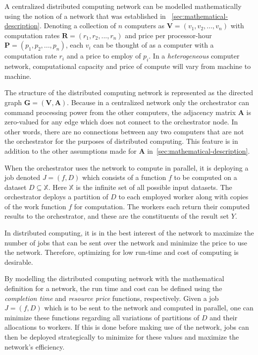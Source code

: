 \documentclass[../mthe-493-project-proposal.tex]{subfiles}
\begin{document}
    A centralized distributed computing network can be modelled mathematically using the notion of a network that was established in ~\autoref{sec:mathematical-description}. Denoting a collection of $n$ computers as $\mathbf{V} = (v_1, v_2, ..., v_n)$ with computation rates $\mathbf{R} = (r_1, r_2, ..., r_n)$ and price per processor-hour $\mathbf{P} = (p_1, p_2, ..., p_n)$, each $v_i$ can be thought of as a computer with a computation rate $r_i$ and a price to employ of $p_i$. In a \textit{heterogeneous} computer network, computational capacity and price of compute will vary from machine to machine.

    The structure of the distributed computing network is represented as the directed graph $\mathbf{G} = (\mathbf{V}, \mathbf{A})$. Because in a centralized network only the orchestrator can command processing power from the other computers, the adjacency matrix $\mathbf{A}$ is zero-valued for any edge which does not connect to the orchestrator node. In other words, there are no connections between any two computers that are not the orchestrator for the purposes of distributed computing. This feature is in addition to the other assumptions made for $\mathbf{A}$ in~\autoref{sec:mathematical-description}.

    When the orchestrator uses the network to compute in parallel, it is deploying a job denoted $J = (f,D)$ which consists of a function $f$ to be computed on a dataset $D \subseteq \mathbb{X}$. Here $\mathbb{X}$ is the infinite set of all possible input datasets. The orchestrator deploys a partition of $D$ to each employed worker along with copies of the work function $f$ for computation. The workers each return their computed results to the orchestrator, and these are the constituents of the result set $Y$.

    In distributed computing, it is in the best interest of the network to maximize the number of jobs that can be sent over the network and minimize the price to use the network. Therefore, optimizing for low run-time and cost of computing is desirable.

    By modelling the distributed computing network with the mathematical definition for a network, the run time and cost can be defined using the \textit{completion time} and \textit{resource price} functions, respectively. Given a job $J = (f,D)$ which is to be sent to the network and computed in parallel, one can minimize these functions regarding all variations of partitions of $D$ and their allocations to workers. If this is done before making use of the network, jobs can then be deployed strategically to minimize for these values and maximize the network's efficiency.
\end{document}
